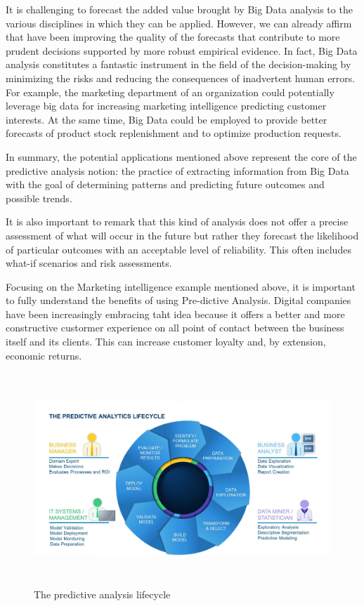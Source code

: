 It is challenging to forecast the added value brought by Big Data analysis to the various disciplines in which they can be applied. However, we can already affirm that have been improving the quality of the forecasts that contribute to more prudent decisions supported by more robust empirical evidence. 
In fact, Big Data analysis constitutes a fantastic instrument in the field of the decision-making by minimizing the risks and reducing the consequences of inadvertent human errors. For example, the marketing department of an organization could potentially leverage big data for increasing marketing intelligence predicting customer interests. At the same time, Big Data could be employed to provide better forecasts of product stock replenishment and to optimize production requests.

In summary, the potential applications mentioned above represent the core of the predictive analysis notion: the practice of extracting information from Big Data with the goal of determining patterns and predicting future outcomes and possible trends. 

It is also important to remark that this kind of analysis does not offer a precise assessment of what will occur in the future but rather they forecast the likelihood of particular outcomes with an acceptable level of reliability. This often includes what-if scenarios and risk assessments.

Focusing on the Marketing intelligence example mentioned above, it is important to fully understand the benefits of using Pre-dictive Analysis. Digital companies have been increasingly embracing taht idea because it offers a better and more constructive custormer experience on all point of contact between the business itself and its clients. This can increase customer loyalty and, by extension, economic returns.

\vspace{0.5cm}
\begin{figure}[htbp]
  \centering
    \includegraphics[height=8cm]{images/pa-lifecycle.jpg}
  \caption{The predictive analysis lifecycle }
  \label{fig:predictive-analysis}
\end{figure}
\vspace{0.5cm}

